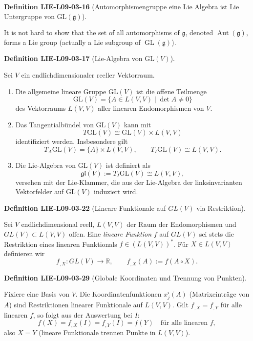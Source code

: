 \documentclass[10pt, letterpaper]{article}
\newcommand{\GL}{\mathrm{GL}}
\newcommand{\CustomHeading}[3]{%
  \par\medskip\noindent%
  \textbf{#1 #2} \textnormal{(#3)}.\enskip%
}
\newenvironment{DEF}[2]{\CustomHeading{Definition}{#1}{#2}}{}
\begin{document}
\begin{DEF}{LIE-L09-03-16}{Automorphismengruppe eine Lie Algebra ist Lie Untergruppe von $\GL(\mathfrak{g})$}
It is not hard to show that the set of all automorphisms of $\mathfrak{g}$, denoted $\operatorname{Aut}(\mathfrak{g})$, forms a Lie group (actually a Lie subgroup of $\operatorname{GL}(\mathfrak{g})$).
\end{DEF}

\begin{DEF}{LIE-L09-03-17}{Lie-Algebra von $\mathrm{GL}(V)$}
Sei $V$ ein endlichdimensionaler reeller Vektorraum.
\begin{enumerate}
\item Die allgemeine lineare Gruppe $\mathrm{GL}(V)$ ist die offene Teilmenge
\[
\mathrm{GL}(V)=\{A\in L(V,V)\mid \det A\neq 0\}
\]
des Vektorraums $L(V,V)$ aller linearen Endomorphismen von $V$.
\item Das Tangentialbündel von $\mathrm{GL}(V)$ kann mit
\[
T\mathrm{GL}(V)\cong \mathrm{GL}(V)\times L(V,V)
\]
identifiziert werden. Insbesondere gilt
\[
T_A\mathrm{GL}(V)=\{A\}\times L(V,V),
\qquad
T_I\mathrm{GL}(V)\cong L(V,V).
\]
\item Die Lie-Algebra von $\mathrm{GL}(V)$ ist definiert als
\[
\mathfrak{gl}(V):=T_I\mathrm{GL}(V)\cong L(V,V),
\]
versehen mit der Lie-Klammer, die aus der Lie-Algebra der linksinvarianten
Vektorfelder auf $\mathrm{GL}(V)$ induziert wird.
\end{enumerate}
\end{DEF}

\begin{DEF}{LIE-L09-03-22}{Lineare Funktionale auf $GL(V)$ via Restriktion}
Sei $V$ endlichdimensional reell, $L(V,V)$ der Raum der Endomorphismen und $GL(V)\subset L(V,V)$ offen.
Eine \emph{lineare Funktion} $f$ auf $GL(V)$ sei stets die Restriktion eines linearen Funktionals
$f\in (L(V,V))^*$.
Für $X\in L(V,V)$ definieren wir
\[
f_{,X}:GL(V)\to\mathbb R,\qquad f_{,X}(A):=f(A\circ X).
\]
\end{DEF}

\begin{DEF}{LIE-L09-03-29}{Globale Koordinaten und Trennung von Punkten}
Fixiere eine Basis von $V$. Die Koordinatenfunktionen $x^i_j(A)$ (Matrixeinträge von $A$) sind
Restriktionen linearer Funktionale auf $L(V,V)$. Gilt $f_{,X}=f_{,Y}$ für alle linearen $f$, so folgt
aus der Auswertung bei $I$:
\[
f(X)=f_{,X}(I)=f_{,Y}(I)=f(Y)\quad\text{für alle linearen }f,
\]
also $X=Y$ (lineare Funktionale trennen Punkte in $L(V,V)$).
\end{DEF}
\end{document}
